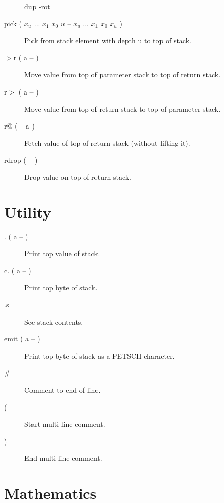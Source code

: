 \begin{description}
dup -rot

\item[pick ( $x_u$ ... $x_1$ $x_0$ $u$ -- $x_u$ ... $x_1$ $x_0$ $x_u$ )]

Pick from stack element with depth u to top of stack.

\item[$>$r ( a -- )]

Move value from top of parameter stack to top of return stack. 

\item[r$>$ ( a -- )]

Move value from top of return stack to top of parameter stack. 

\item[r@ ( -- a )]

Fetch value of top of return stack (without lifting it).

\item[rdrop ( -- )]

Drop value on top of return stack.

\end{description}

\section{Utility}

\begin{description}
\item[. ( a -- )] Print top value of stack.
\item[c. ( a -- )] Print top byte of stack.
\item[.s] See stack contents.
\item[emit ( a -- )] Print top byte of stack as a PETSCII character.
\item[\#] Comment to end of line.
\item[(] Start multi-line comment.
\item[)] End multi-line comment.
\end{description}


\section{Mathematics}


